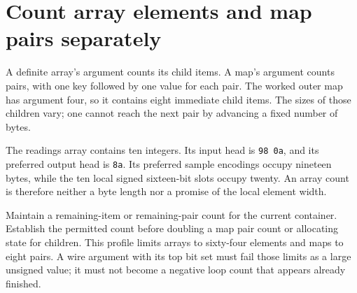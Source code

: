 \section{Count array elements and map pairs separately}
A definite array's argument counts its child items. A map's argument counts pairs,
with one key followed by one value for each pair. The worked outer map has argument
four, so it contains eight immediate child items. The sizes of those children vary;
one cannot reach the next pair by advancing a fixed number of bytes.

The readings array contains ten integers. Its input head is \texttt{98 0a}, and its
preferred output head is \texttt{8a}. Its preferred sample encodings occupy nineteen
bytes, while the ten local signed sixteen-bit slots occupy twenty. An array count is
therefore neither a byte length nor a promise of the local element width.

Maintain a remaining-item or remaining-pair count for the current container. Establish
the permitted count before doubling a map pair count or allocating state for children.
This profile limits arrays to sixty-four elements and maps to eight pairs. A wire
argument with its top bit set must fail those limits as a large unsigned value; it
must not become a negative loop count that appears already finished.
